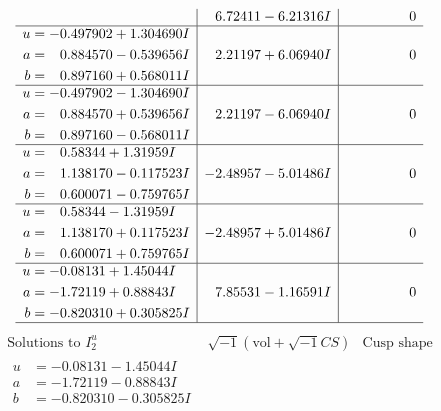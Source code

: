 \documentclass[1p]{elsarticle_modified}
\theoremstyle{definition}
\newcommand{\I}{\sqrt{-1}}
\begin{document}
$$\begin{array}{c|c|c}
 & \phantom{-}6.72411 - 6.21316 I & \phantom{-0.000000 } 0 \\ \hline\begin{aligned}
u &= -0.497902 + 1.304690 I \\
a &= \phantom{-}0.884570 - 0.539656 I \\
b &= \phantom{-}0.897160 + 0.568011 I\end{aligned}
 & \phantom{-}2.21197 + 6.06940 I & \phantom{-0.000000 } 0 \\ \hline\begin{aligned}
u &= -0.497902 - 1.304690 I \\
a &= \phantom{-}0.884570 + 0.539656 I \\
b &= \phantom{-}0.897160 - 0.568011 I\end{aligned}
 & \phantom{-}2.21197 - 6.06940 I & \phantom{-0.000000 } 0 \\ \hline\begin{aligned}
u &= \phantom{-}0.58344 + 1.31959 I \\
a &= \phantom{-}1.138170 - 0.117523 I \\
b &= \phantom{-}0.600071 - 0.759765 I\end{aligned}
 & -2.48957 - 5.01486 I & \phantom{-0.000000 } 0 \\ \hline\begin{aligned}
u &= \phantom{-}0.58344 - 1.31959 I \\
a &= \phantom{-}1.138170 + 0.117523 I \\
b &= \phantom{-}0.600071 + 0.759765 I\end{aligned}
 & -2.48957 + 5.01486 I & \phantom{-0.000000 } 0 \\ \hline\begin{aligned}
u &= -0.08131 + 1.45044 I \\
a &= -1.72119 + 0.88843 I \\
b &= -0.820310 + 0.305825 I\end{aligned}
 & \phantom{-}7.85531 - 1.16591 I & \phantom{-0.000000 } 0\\
 \hline 
 \end{array}$$\newpage$$\begin{array}{c|c|c}  
\text{Solutions to }I^u_{2}& \I (\text{vol} + \sqrt{-1}CS) & \text{Cusp shape}\\
 \hline 
\begin{aligned}
u &= -0.08131 - 1.45044 I \\
a &= -1.72119 - 0.88843 I \\
b &= -0.820310 - 0.305825 I\end{aligned}

\end{array}$$
\end{document}
